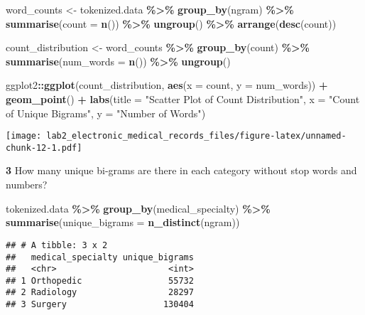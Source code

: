 \documentclass[
]{article}
\newenvironment{Shaded}{\begin{snugshade}}{\end{snugshade}}
\newcommand{\AttributeTok}[1]{\textcolor[rgb]{0.13,0.29,0.53}{#1}}
\newcommand{\FunctionTok}[1]{\textcolor[rgb]{0.13,0.29,0.53}{\textbf{#1}}}
\newcommand{\NormalTok}[1]{#1}
\newcommand{\OtherTok}[1]{\textcolor[rgb]{0.56,0.35,0.01}{#1}}
\newcommand{\SpecialCharTok}[1]{\textcolor[rgb]{0.81,0.36,0.00}{\textbf{#1}}}
\newcommand{\StringTok}[1]{\textcolor[rgb]{0.31,0.60,0.02}{#1}}
\begin{document}
\begin{Shaded}
\begin{Highlighting}[]
\NormalTok{word\_counts }\OtherTok{\textless{}{-}}\NormalTok{ tokenized.data }\SpecialCharTok{\%\textgreater{}\%}
    \FunctionTok{group\_by}\NormalTok{(ngram) }\SpecialCharTok{\%\textgreater{}\%}
    \FunctionTok{summarise}\NormalTok{(}\AttributeTok{count =} \FunctionTok{n}\NormalTok{()) }\SpecialCharTok{\%\textgreater{}\%}
    \FunctionTok{ungroup}\NormalTok{() }\SpecialCharTok{\%\textgreater{}\%}
    \FunctionTok{arrange}\NormalTok{(}\FunctionTok{desc}\NormalTok{(count))}

\NormalTok{count\_distribution }\OtherTok{\textless{}{-}}\NormalTok{ word\_counts }\SpecialCharTok{\%\textgreater{}\%}
  \FunctionTok{group\_by}\NormalTok{(count) }\SpecialCharTok{\%\textgreater{}\%}
  \FunctionTok{summarise}\NormalTok{(}\AttributeTok{num\_words =} \FunctionTok{n}\NormalTok{()) }\SpecialCharTok{\%\textgreater{}\%}
  \FunctionTok{ungroup}\NormalTok{()}
 
\NormalTok{ ggplot2}\SpecialCharTok{::}\FunctionTok{ggplot}\NormalTok{(count\_distribution, }\FunctionTok{aes}\NormalTok{(}\AttributeTok{x =}\NormalTok{ count, }\AttributeTok{y =}\NormalTok{ num\_words)) }\SpecialCharTok{+}
  \FunctionTok{geom\_point}\NormalTok{() }\SpecialCharTok{+}
  \FunctionTok{labs}\NormalTok{(}\AttributeTok{title =} \StringTok{"Scatter Plot of Count Distribution"}\NormalTok{,}
       \AttributeTok{x =} \StringTok{"Count of Unique Bigrams"}\NormalTok{,}
       \AttributeTok{y =} \StringTok{"Number of Words"}\NormalTok{)}
\end{Highlighting}
\end{Shaded}

\texttt{[image: lab2\_electronic\_medical\_records\_files/figure-latex/unnamed-chunk-12-1.pdf]}

\textbf{3} How many unique bi-grams are there in each category without
stop words and numbers?

\begin{Shaded}
\begin{Highlighting}[]
\NormalTok{tokenized.data }\SpecialCharTok{\%\textgreater{}\%}
  \FunctionTok{group\_by}\NormalTok{(medical\_specialty) }\SpecialCharTok{\%\textgreater{}\%}
  \FunctionTok{summarise}\NormalTok{(}\AttributeTok{unique\_bigrams =} \FunctionTok{n\_distinct}\NormalTok{(ngram))}
\end{Highlighting}
\end{Shaded}

\begin{verbatim}
## # A tibble: 3 x 2
##   medical_specialty unique_bigrams
##   <chr>                      <int>
## 1 Orthopedic                 55732
## 2 Radiology                  28297
## 3 Surgery                   130404
\end{verbatim}
\end{document}
